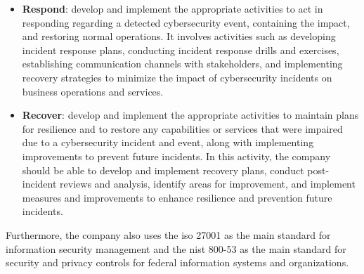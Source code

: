 \begin{multicols}{2}
\begin{itemize}
            \item \textbf{Respond}: develop and implement the appropriate activities to act in responding
                  regarding a detected cybersecurity event, containing the impact, and restoring normal operations.
                  It involves activities such as developing incident response plans, conducting incident response
                  drills and exercises, establishing communication channels with stakeholders, and implementing
                  recovery strategies to minimize the impact of cybersecurity incidents on business operations and
                  services.
            \item \textbf{Recover}: develop and implement the appropriate activities to maintain plans for
                  resilience and to restore any capabilities or services that were impaired due to a cybersecurity
                  incident and event, along with implementing improvements to prevent future incidents. In this
                  activity,  the company should be able to develop and implement recovery plans, conduct
                  post-incident reviews and analysis, identify areas for improvement, and implement measures and
                  improvements to enhance resilience and prevention future incidents.
      \end{itemize}
      Furthermore, the company also uses the \acrshort{iso} 27001 as the main standard for information security
      management and the \acrshort{nist} 800-53 as the main standard for security and privacy controls for federal
      information systems and organizations.

\end{multicols}
